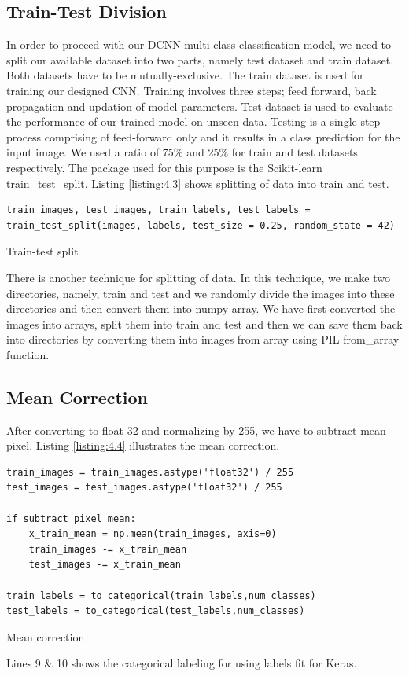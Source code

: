 \subsection{Train-Test Division}
In order to proceed with our DCNN multi-class classification model,
we need to split our available dataset into two parts, namely test 
dataset and train dataset. Both datasets have to be mutually-exclusive.
The train dataset is used for training our designed CNN.
Training involves three steps; feed forward, back propagation and
updation of model parameters. Test dataset is used to evaluate the performance
of our trained model on unseen data. Testing is a single step process
comprising of feed-forward only and it results in a  class
prediction for the input image. We used a ratio of 75\% and
25\% for train and test datasets respectively. The package used for this purpose is the
Scikit-learn train\_test\_split. Listing \ref{listing:4.3} shows splitting of
data into train and test.

\begin{listing}[H]
    \begin{verbatim}
train_images, test_images, train_labels, test_labels = 
train_test_split(images, labels, test_size = 0.25, random_state = 42)
\end{verbatim}
\caption{Train-test split}
\label{listing:4.3}
\end{listing}
There is another technique for splitting of data. In this technique, we make two directories,
namely, train and test and we randomly divide the images into these directories and then
convert them into numpy array. We have first converted the images
into arrays, split them into train and test and then we can save them back into
directories by converting them into images from array using PIL from\_array
function.

\subsection{Mean Correction}
After converting to float 32 and normalizing by 255, we have to subtract mean pixel.
Listing \ref{listing:4.4} illustrates the mean correction.

\begin{listing}[H]
    \begin{verbatim}
train_images = train_images.astype('float32') / 255
test_images = test_images.astype('float32') / 255

if subtract_pixel_mean:
    x_train_mean = np.mean(train_images, axis=0)
    train_images -= x_train_mean
    test_images -= x_train_mean

train_labels = to_categorical(train_labels,num_classes)
test_labels = to_categorical(test_labels,num_classes)
    \end{verbatim}
    \caption{Mean correction}
\label{listing:4.4}
\end{listing}
\noindent Lines 9 \& 10 shows the categorical labeling for using labels fit for Keras.
